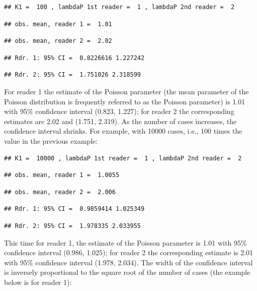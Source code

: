 \documentclass[
]{book}
\begin{document}
\begin{verbatim}
## K1 =  100 , lambdaP 1st reader =  1 , lambdaP 2nd reader =  2
\end{verbatim}

\begin{verbatim}
## obs. mean, reader 1 =  1.01
\end{verbatim}

\begin{verbatim}
## obs. mean, reader 2 =  2.02
\end{verbatim}

\begin{verbatim}
## Rdr. 1: 95% CI =  0.8226616 1.227242
\end{verbatim}

\begin{verbatim}
## Rdr. 2: 95% CI =  1.751026 2.318599
\end{verbatim}

For reader 1 the estimate of the Poisson parameter (the mean parameter of the Poisson distribution is frequently referred to as the Poisson parameter) is 1.01 with 95\% confidence interval (0.823, 1.227); for reader 2 the corresponding estimates are 2.02 and (1.751, 2.319). As the number of cases increases, the confidence interval shrinks. For example, with 10000 cases, i.e., 100 times the value in the previous example:

\begin{verbatim}
## K1 =  10000 , lambdaP 1st reader =  1 , lambdaP 2nd reader =  2
\end{verbatim}

\begin{verbatim}
## obs. mean, reader 1 =  1.0055
\end{verbatim}

\begin{verbatim}
## obs. mean, reader 2 =  2.006
\end{verbatim}

\begin{verbatim}
## Rdr. 1: 95% CI =  0.9859414 1.025349
\end{verbatim}

\begin{verbatim}
## Rdr. 2: 95% CI =  1.978335 2.033955
\end{verbatim}

This time for reader 1, the estimate of the Poisson parameter is 1.01 with 95\% confidence interval (0.986, 1.025); for reader 2 the corresponding estimate is 2.01 with 95\% confidence interval (1.978, 2.034). The width of the confidence interval is inversely proportional to the square root of the number of cases (the example below is for reader 1):
\end{document}
